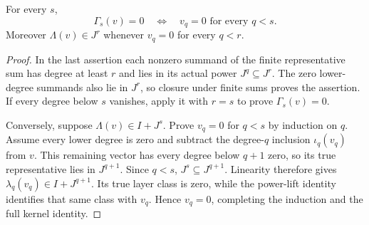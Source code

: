 \begin{theorem}
\label{hir:relative-normal-actual-power-lift-truncation-whole-kernel}
\leanok
For every $s$,
\[
 \Gamma_s(v)=0\quad\Longleftrightarrow\quad
 v_q=0\text{ for every }q<s.
\]
Moreover $\Lambda(v)\in J^r$ whenever $v_q=0$ for every $q<r$.
\end{theorem}
\begin{proof}
In the last assertion each nonzero summand of the finite representative
sum has degree at least $r$ and lies in its actual power $J^q\subseteq
J^r$. The zero lower-degree summands also lie in $J^r$, so closure
under finite sums proves the assertion. If every degree below $s$
vanishes, apply it with $r=s$ to prove $\Gamma_s(v)=0$.

Conversely, suppose $\Lambda(v)\in I+J^s$. Prove $v_q=0$ for $q<s$
by induction on $q$. Assume every lower degree is zero and subtract
the degree-$q$ inclusion $\iota_q(v_q)$ from $v$. This remaining vector
has every degree below $q+1$ zero, so its true representative lies in
$J^{q+1}$. Since $q<s$, $J^s\subseteq J^{q+1}$. Linearity therefore
gives $\lambda_q(v_q)\in I+J^{q+1}$. Its true layer class is zero,
while the power-lift identity identifies that same class with $v_q$.
Hence $v_q=0$, completing the induction and the full kernel identity.
\end{proof}


